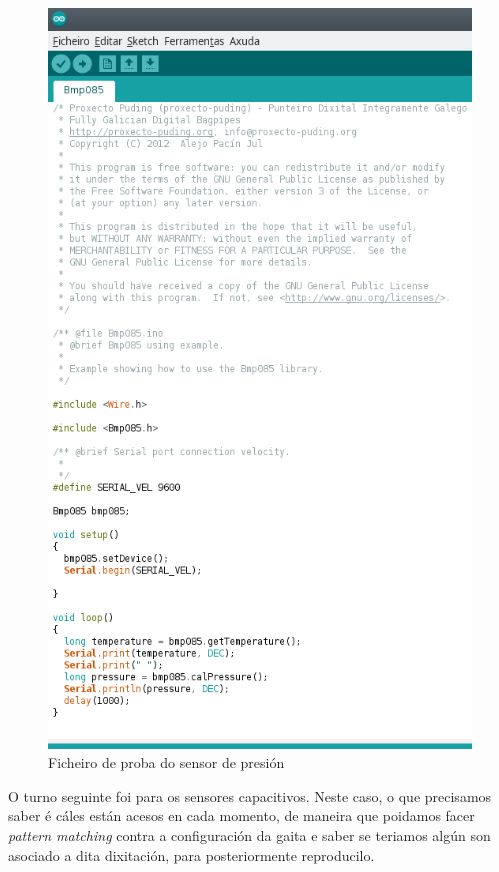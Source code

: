    \begin{figure}[htbp]
    \centering
    \includegraphics[scale=0.8,keepaspectratio=true]{./imagenes/test-sensor-presion.png}
    \caption{Ficheiro de proba do sensor de presión}
    \label{figura:TestSensorPresion}
   \end{figure}
   
   O turno seguinte foi para os sensores capacitivos. Neste caso, o que
   precisamos saber é cáles están acesos en cada momento, de maneira que
   poidamos facer \textit{pattern matching} contra a configuración da gaita e
   saber se teriamos algún son asociado a dita dixitación, para posteriormente
   reproducilo. \\
   

